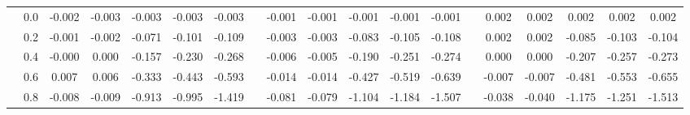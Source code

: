 \begin{table}
{\begin{tabular}{llccccccccccccccccc}
 & 0.0 & \cellcolor[HTML]{7AB2D4}-0.002 & \cellcolor[HTML]{7AB2D4}-0.003 & \cellcolor[HTML]{7AB2D4}-0.003 & \cellcolor[HTML]{7AB2D4}-0.003 & \cellcolor[HTML]{7AB2D4}-0.003 & & \cellcolor[HTML]{76AED2}-0.001 & \cellcolor[HTML]{76AED2}-0.001 & \cellcolor[HTML]{76AFD2}-0.001 & \cellcolor[HTML]{76AED2}-0.001 & \cellcolor[HTML]{77AFD2}-0.001 & & \cellcolor[HTML]{77B0D2}0.002 & \cellcolor[HTML]{77B0D2}0.002 & \cellcolor[HTML]{77B0D2}0.002 & \cellcolor[HTML]{77B0D2}0.002 & \cellcolor[HTML]{77AFD2}0.002 \\
 & 0.2 & \cellcolor[HTML]{77AFD2}-0.001 & \cellcolor[HTML]{78B0D3}-0.002 & \cellcolor[HTML]{CBE8F2}-0.071 & \cellcolor[HTML]{DDF1F7}-0.101 & \cellcolor[HTML]{E0F3F8}-0.109 & & \cellcolor[HTML]{7BB2D4}-0.003 & \cellcolor[HTML]{7AB1D3}-0.003 & \cellcolor[HTML]{CFEBF3}-0.083 & \cellcolor[HTML]{DBF1F7}-0.105 & \cellcolor[HTML]{DDF1F7}-0.108 & & \cellcolor[HTML]{77B0D2}0.002 & \cellcolor[HTML]{78B0D3}0.002 & \cellcolor[HTML]{D0EBF3}-0.085 & \cellcolor[HTML]{DAF0F6}-0.103 & \cellcolor[HTML]{DBF0F6}-0.104 \\
 & 0.4 & \cellcolor[HTML]{75AED1}-0.000 & \cellcolor[HTML]{74ADD1}0.000 & \cellcolor[HTML]{EEF8E2}-0.157 & \cellcolor[HTML]{FAFDCA}-0.230 & \cellcolor[HTML]{FFFFC0}-0.268 & & \cellcolor[HTML]{81B7D7}-0.006 & \cellcolor[HTML]{7FB6D6}-0.005 & \cellcolor[HTML]{F2F9DA}-0.190 & \cellcolor[HTML]{FBFDC8}-0.251 & \cellcolor[HTML]{FDFEC3}-0.274 & & \cellcolor[HTML]{74ADD1}0.000 & \cellcolor[HTML]{74ADD1}0.000 & \cellcolor[HTML]{F5FAD5}-0.207 & \cellcolor[HTML]{FBFDC7}-0.257 & \cellcolor[HTML]{FDFEC3}-0.273 \\
 & 0.6 & \cellcolor[HTML]{84BAD8}0.007 & \cellcolor[HTML]{81B7D7}0.006 & \cellcolor[HTML]{FFF8B4}-0.333 & \cellcolor[HTML]{FFEDA4}-0.443 & \cellcolor[HTML]{FEE294}-0.593 & & \cellcolor[HTML]{8FC2DC}-0.014 & \cellcolor[HTML]{90C2DD}-0.014 & \cellcolor[HTML]{FFF1A9}-0.427 & \cellcolor[HTML]{FFEA9E}-0.519 & \cellcolor[HTML]{FEE293}-0.639 & & \cellcolor[HTML]{81B7D7}-0.007 & \cellcolor[HTML]{82B8D7}-0.007 & \cellcolor[HTML]{FFEDA3}-0.481 & \cellcolor[HTML]{FFE79B}-0.553 & \cellcolor[HTML]{FEE192}-0.655 \\
 & 0.8 & \cellcolor[HTML]{85BAD8}-0.008 & \cellcolor[HTML]{87BBD9}-0.009 & \cellcolor[HTML]{FEC97B}-0.913 & \cellcolor[HTML]{FEC476}-0.995 & \cellcolor[HTML]{FDAE61}-1.419 & & \cellcolor[HTML]{CEEAF3}-0.081 & \cellcolor[HTML]{CDE9F3}-0.079 & \cellcolor[HTML]{FEC173}-1.104 & \cellcolor[HTML]{FEBD6F}-1.184 & \cellcolor[HTML]{FDAE61}-1.507 & & \cellcolor[HTML]{ACDAE9}-0.038 & \cellcolor[HTML]{AEDBEA}-0.040 & \cellcolor[HTML]{FEBE70}-1.175 & \cellcolor[HTML]{FEBA6C}-1.251 & \cellcolor[HTML]{FDAE61}-1.513 \\

\end{tabular}}
\end{table}
